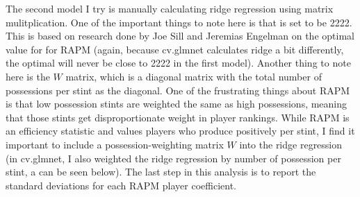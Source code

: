\documentclass[]{article}
\begin{document}
The second model I try is manually calculating ridge regression using
matrix mulitplication. One of the important things to note here is that
\lambda is set to be 2222. This is based on research done by Joe Sill
and Jeremias Engelman on the optimal value for \lambda for RAPM (again,
because cv.glmnet calculates ridge a bit differently, the optimal
\lambda will never be close to 2222 in the first model). Another thing
to note here is the \(W\) matrix, which is a diagonal matrix with the
total number of possessions per stint as the diagonal. One of the
frustrating things about RAPM is that low possession stints are weighted
the same as high possessions, meaning that those stints get
disproportionate weight in player rankings. While RAPM is an efficiency
statistic and values players who produce positively per stint, I find it
important to include a possession-weighting matrix \(W\) into the ridge
regression (in cv.glmnet, I also weighted the ridge regression by number
of possession per stint, a can be seen below). The last step in this
analysis is to report the standard deviations for each RAPM player
coefficient.
\end{document}

